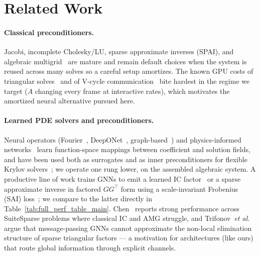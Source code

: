 \documentclass[acmtog,anonymous,review]{acmart}
\theoremstyle{plain}
\begin{document}
\section{Related Work}
\label{sec:related}

\paragraph{Classical preconditioners.}
Jacobi, incomplete Cholesky/LU, sparse approximate inverses (SPAI), and algebraic
multigrid~\cite{saad2003iterative,lin1999incomplete,kolotilina1993factorized,benzi1996sparse,ruge1987algebraic,naumov2015amgx}
are mature and remain default choices when the system is reused across many solves so a
careful setup amortizes. The known GPU costs of triangular
solves~\cite{liu2016synchronization,yamazaki2020performance} and of V-cycle
communication~\cite{naumov2015amgx} bite hardest in the regime we target
($A$ changing every frame at interactive rates), which motivates the amortized neural
alternative pursued here.

\paragraph{Learned PDE solvers and preconditioners.}
Neural operators (Fourier~\cite{li2021fourier}, DeepONet~\cite{lu2021learning},
graph-based~\cite{li2020neural,li2020multipole}) and physics-informed
networks~\cite{raissi2019physics} learn function-space mappings between coefficient and
solution fields, and have been used both as surrogates and as inner preconditioners for
flexible Krylov solvers~\cite{rudikov2024neural}; we operate one rung lower, on the
assembled algebraic system. A productive line of work trains GNNs to emit a learned IC
factor~\cite{Li2023learning,hausner2023neural,trifonov2024linear} or a sparse approximate
inverse in factored $GG^\top$ form using a scale-invariant Frobenius (SAI)
loss~\cite{Yang2025sparse}; we compare to the latter directly in
Table~\ref{tab:full_perf_table_main}. Chen~\cite{chen2024gnp} reports strong performance
across SuiteSparse problems where classical IC and AMG struggle, and
Trifonov~\emph{et al.}~\cite{trifonov2025gnn} argue that message-passing GNNs cannot
approximate the non-local elimination structure of sparse triangular factors --- a
motivation for architectures (like ours) that route global information through explicit
channels.
\end{document}
